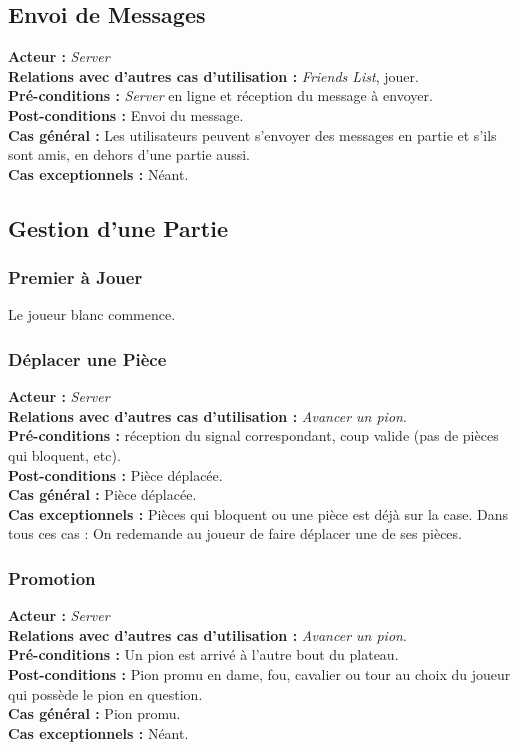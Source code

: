 \documentclass[10pt, a4paper]{article}
\begin{document}
\subsection{Envoi de Messages}
\textbf{Acteur :} \textit{Server} \\
\textbf{Relations avec d'autres cas d'utilisation :} \textit{Friends List}, jouer. \\
\textbf{Pré-conditions :} \textit{Server} en ligne et réception du message à envoyer. \\
\textbf{Post-conditions :} Envoi du message. \\
\textbf{Cas général :} Les utilisateurs peuvent s'envoyer des messages en partie et s'ils sont amis, en dehors d'une partie aussi. \\
\textbf{Cas exceptionnels :} Néant. \\

\subsection{Gestion d'une Partie}

\subsubsection{Premier à Jouer}
Le joueur blanc commence.

\subsubsection{Déplacer une Pièce}
\textbf{Acteur :} \textit{Server} \\
\textbf{Relations avec d'autres cas d'utilisation :} {\itshape Avancer un pion}. \\
\textbf{Pré-conditions :} réception du signal correspondant, coup valide (pas de pièces qui bloquent, etc). \\
\textbf{Post-conditions :} Pièce déplacée. \\
\textbf{Cas général :} Pièce déplacée. \\
\textbf{Cas exceptionnels :} Pièces qui bloquent ou une pièce est déjà sur la case. Dans tous ces cas : On redemande au joueur de faire déplacer une de ses pièces. \\

\subsubsection{Promotion}
\textbf{Acteur :} \textit{Server} \\
\textbf{Relations avec d'autres cas d'utilisation :} {\itshape Avancer un pion}. \\
\textbf{Pré-conditions :} Un pion est arrivé à l'autre bout du plateau. \\
\textbf{Post-conditions :} Pion promu en dame, fou, cavalier ou tour au choix du joueur qui possède le pion en question. \\
\textbf{Cas général :} Pion promu. \\
\textbf{Cas exceptionnels :} Néant. \\
\end{document}
